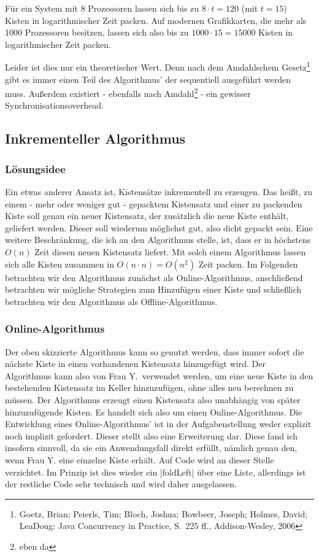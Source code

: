  Für ein System mit 8 Prozessoren lassen sich bis zu $8 \cdot t = 120$ (mit $t=15$) Kisten in logarithmischer Zeit packen.
 Auf modernen Grafikkarten, die mehr als 1000 Prozessoren besitzen, lassen sich also bis zu $1000 \cdot 15=15000$ Kisten in logarithmischer Zeit packen.

 Leider ist dies nur ein theoretischer Wert. Denn nach dem Amdahlschem Gesetz\footnote{Goetz, Brian; Peierls, Tim; Bloch, Joshua; Bowbeer, Joseph; Holmes, David; LeaDoug: Java Concurrency in Practice, S.\ 225 ff., Addison-Wesley, 2006}
  gibt es immer einen Teil des Algorithmus' der sequentiell ausgeführt werden muss.
 Außerdem existiert - ebenfalls nach Amdahl\footnote{eben da} - ein gewisser Synchronisationsoverhead.

\clearpage
\subsection{Inkrementeller Algorithmus}
\label{ink}
\subsubsection{Lösungsidee}
 Ein etwas anderer Ansatz ist, Kistensätze inkrementell zu erzeugen.
 Das heißt, zu einem - mehr oder weniger gut - gepacktem Kistensatz und einer zu packenden Kiste soll genau ein neuer Kistensatz,
  der zusätzlich die neue Kiste enthält, geliefert werden.
 Dieser soll wiederum möglichst gut, also dicht gepackt sein.
 Eine weitere Beschränkung, die ich an den Algorithmus stelle, ist, dass er in höchstens $O(n)$ Zeit diesen neuen Kistensatz liefert.
 Mit solch einem Algorithmus lassen sich alle Kisten zusammen in $O(n \cdot n)=O(n^2)$ Zeit packen.
 Im Folgenden betrachten wir den Algorithmus zunächst als Online-Algorithmus, anschließend betrachten wir mögliche Strategien zum Hinzufügen einer Kiste
  und schließlich betrachten wir den Algorithmus als Offline-Algorithmus.
\subsubsection{Online-Algorithmus}
 Der oben skizzierte Algorithmus kann so genutzt werden, dass immer sofort die nächste Kiste in einen vorhandenen Kistensatz hinzugefügt wird.
 Der Algorithmus kann also von Frau Y.\ verwendet werden,
  um eine neue Kiste in den bestehenden Kistensatz im Keller hinzuzufügen, ohne alles neu berechnen zu müssen.
 Der Algorithmus erzeugt einen Kistensatz also unabhängig von später hinzuzufügende Kisten.
 Es handelt sich also um einen Online-Algorithmus. Die Entwicklung eines Online-Algorithmus' ist in der Aufgabenstellung weder explizit noch implizit gefordert.
 Dieser stellt also eine Erweiterung dar.
 Diese fand ich insofern sinnvoll, da sie ein Anwendungsfall direkt erfüllt, nämlich genau den, wenn Frau Y. eine einzelne Kiste erhält.
 Auf Code wird an dieser Stelle verzichtet. Im Prinzip ist dies wieder ein |foldLeft| über eine Liste, allerdings ist der restliche Code sehr technisch
  und wird daher ausgelassen.
\lstset{basicstyle=\ttfamily}
